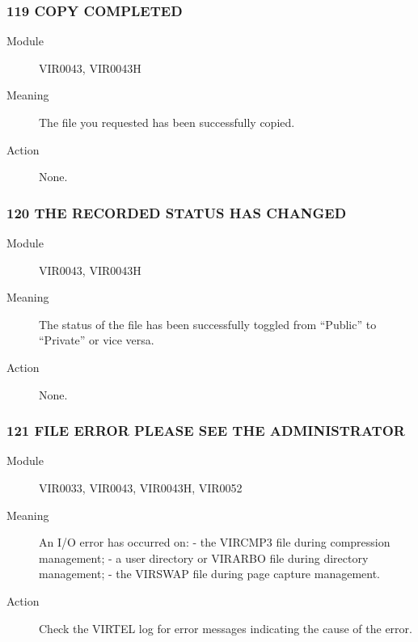 \documentclass[letterpaper,10pt,english]{sphinxmanual}
\begin{document}
\subsubsection{119 COPY COMPLETED}
\label{\detokenize{messages:copy-completed}}\begin{description}
\item[{Module}] \leavevmode
VIR0043, VIR0043H

\item[{Meaning}] \leavevmode
The file you requested has been successfully copied.

\item[{Action}] \leavevmode
None.

\end{description}


\subsubsection{120 THE RECORDED STATUS HAS CHANGED}
\label{\detokenize{messages:the-recorded-status-has-changed}}\begin{description}
\item[{Module}] \leavevmode
VIR0043, VIR0043H

\item[{Meaning}] \leavevmode
The status of the file has been successfully toggled from “Public” to “Private” or vice versa.

\item[{Action}] \leavevmode
None.

\end{description}


\subsubsection{121 FILE ERROR PLEASE SEE THE ADMINISTRATOR}
\label{\detokenize{messages:file-error-please-see-the-administrator}}\begin{description}
\item[{Module}] \leavevmode
VIR0033, VIR0043, VIR0043H, VIR0052

\item[{Meaning}] \leavevmode
An I/O error has occurred on:
- the VIRCMP3 file during compression management;
- a user directory or VIRARBO file during directory management;
- the VIRSWAP file during page capture management.

\item[{Action}] \leavevmode
Check the VIRTEL log for error messages indicating the cause of the error.

\end{description}
\end{document}
